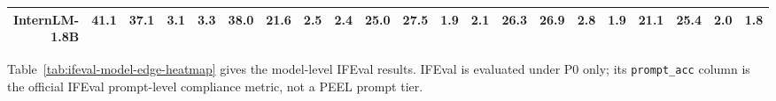 \documentclass[letterpaper]{article}
\begin{document}
\begin{table}[t]
{\begin{tabular}{rrrrr|rrrr|rrrr|rrrr|rrrr}
InternLM-1.8B & \cellcolor[HTML]{EFEFCC}41.1 & \cellcolor[HTML]{F6F0CC}37.1 & \cellcolor[HTML]{F8CCCC}3.1 & \cellcolor[HTML]{F8CCCC}3.3 & \cellcolor[HTML]{F2EFCC}38.0 & \cellcolor[HTML]{FDE6CC}21.6 & \cellcolor[HTML]{F8CCCC}2.5 & \cellcolor[HTML]{F8CCCC}2.4 & \cellcolor[HTML]{FFF2CC}25.0 & \cellcolor[HTML]{FAF1CC}27.5 & \cellcolor[HTML]{F8CECC}1.9 & \cellcolor[HTML]{F8CFCC}2.1 & \cellcolor[HTML]{FCF2CC}26.3 & \cellcolor[HTML]{FBF1CC}26.9 & \cellcolor[HTML]{F8CFCC}2.8 & \cellcolor[HTML]{F8CDCC}1.9 & \cellcolor[HTML]{FEECCC}21.1 & \cellcolor[HTML]{FFF2CC}25.4 & \cellcolor[HTML]{F8CECC}2.0 & \cellcolor[HTML]{F8CECC}1.8 \\
\bottomrule
\end{tabular}%
}
\end{table}


Table~\ref{tab:ifeval-model-edge-heatmap} gives the model-level IFEval results. IFEval is evaluated under P0
only; its \texttt{prompt\_acc} column is the official IFEval prompt-level
compliance metric, not a PEEL prompt tier.
\end{document}
